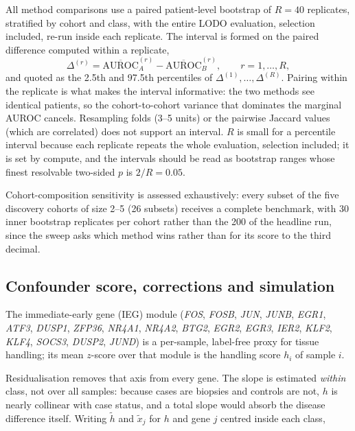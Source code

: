 \documentclass[pdflatex,sn-vancouver-num]{sn-jnl}
\theoremstyle{thmstyleone}
\theoremstyle{thmstyletwo}
\theoremstyle{thmstylethree}
\begin{document}
All method comparisons use a paired patient-level bootstrap of $R = 40$ replicates, stratified by cohort and class, with the entire LODO evaluation, selection included, re-run inside each replicate. The interval is formed on the paired difference computed within a replicate,
\begin{equation}
\Delta^{(r)} = \overline{\mathrm{AUROC}}_{A}^{(r)}
- \overline{\mathrm{AUROC}}_{B}^{(r)} ,
\qquad r = 1,\dots,R ,
\label{eq:paired}
\end{equation}
and quoted as the 2.5th and 97.5th percentiles of $\Delta^{(1)},\dots,\Delta^{(R)}$. Pairing within the replicate is what makes the interval informative: the two methods see identical patients, so the cohort-to-cohort variance that dominates the marginal AUROC cancels. Resampling folds (3--5 units) or the pairwise
Jaccard values (which are correlated) does not support an interval. $R$ is small for a percentile interval because each replicate repeats the whole evaluation, selection included; it is set by compute, and the intervals should be read as bootstrap ranges whose finest resolvable two-sided $p$ is $2/R = 0.05$.

Cohort-composition sensitivity is assessed exhaustively: every subset of the five discovery
cohorts of size 2--5 (26 subsets) receives a complete benchmark, with 30 inner bootstrap replicates per cohort rather than the 200 of the headline run, since the sweep asks which method wins rather than for its score to the third decimal.

\subsection{Confounder score, corrections and simulation}\label{sec:corrections}

The immediate-early gene (IEG) module (\textit{FOS}, \textit{FOSB}, \textit{JUN}, \textit{JUNB},
\textit{EGR1}, \textit{ATF3}, \textit{DUSP1}, \textit{ZFP36}, \textit{NR4A1}, \textit{NR4A2},
\textit{BTG2}, \textit{EGR2}, \textit{EGR3}, \textit{IER2}, \textit{KLF2}, \textit{KLF4},
\textit{SOCS3}, \textit{DUSP2}, \textit{JUND}) is a per-sample, label-free proxy for tissue
handling; its mean $z$-score over that module is the handling score $h_i$ of sample $i$.

Residualisation removes that axis from every gene. The slope is estimated \emph{within} class,
not over all samples: because cases are biopsies and controls are not, $h$ is nearly collinear
with case status, and a total slope would absorb the disease difference itself. Writing $\tilde{h}$
and $\tilde{x}_j$ for $h$ and gene $j$ centred inside each class,
\end{document}
